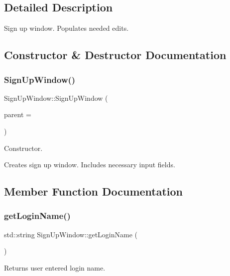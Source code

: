 \subsection{Detailed Description}
Sign up window. Populates needed edits. 

\subsection{Constructor \& Destructor Documentation}
\mbox{\label{class_sign_up_window_aaf6b145da15912da668cd6a4dc380bd5}} 
\subsubsection{\texorpdfstring{Sign\+Up\+Window()}{SignUpWindow()}}
{\footnotesize\ttfamily Sign\+Up\+Window\+::\+Sign\+Up\+Window (\begin{DoxyParamCaption}\item[{Q\+Widget $\ast$}]{parent = {} }\end{DoxyParamCaption})}



Constructor. 

Creates sign up window. Includes necessary input fields. 

\subsection{Member Function Documentation}
\mbox{\label{class_sign_up_window_a57f7f4f906052c87ea9b0922e74ca657}} 
\subsubsection{\texorpdfstring{get\+Login\+Name()}{getLoginName()}}
{\footnotesize\ttfamily std\+::string Sign\+Up\+Window\+::get\+Login\+Name (\begin{DoxyParamCaption}{ }\end{DoxyParamCaption})}



Returns user entered login name. 

